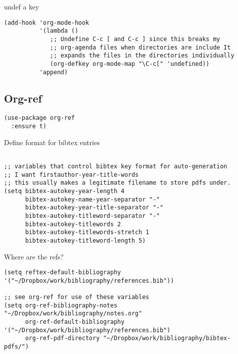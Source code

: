 \documentclass[12pt]{article}
\begin{document}
undef a key

\lstset{language=Lisp,label= ,caption= ,captionpos=b,numbers=none}
\begin{lstlisting}
(add-hook 'org-mode-hook
          '(lambda ()
             ;; Undefine C-c [ and C-c ] since this breaks my
             ;; org-agenda files when directories are include It
             ;; expands the files in the directories individually
             (org-defkey org-mode-map "\C-c[" 'undefined))
          'append)

\end{lstlisting}

\subsection{Org-ref}
\label{sec:org04fd8c5}

\lstset{language=Lisp,label= ,caption= ,captionpos=b,numbers=none}
\begin{lstlisting}
(use-package org-ref
  :ensure t)
\end{lstlisting}

Define format for bibtex entries


\lstset{language=Lisp,label= ,caption= ,captionpos=b,numbers=none}
\begin{lstlisting}

;; variables that control bibtex key format for auto-generation
;; I want firstauthor-year-title-words
;; this usually makes a legitimate filename to store pdfs under.
(setq bibtex-autokey-year-length 4
      bibtex-autokey-name-year-separator "-"
      bibtex-autokey-year-title-separator "-"
      bibtex-autokey-titleword-separator "-"
      bibtex-autokey-titlewords 2
      bibtex-autokey-titlewords-stretch 1
      bibtex-autokey-titleword-length 5)
\end{lstlisting}

Where are the refs?

\lstset{language=Lisp,label= ,caption= ,captionpos=b,numbers=none}
\begin{lstlisting}
(setq reftex-default-bibliography '("~/Dropbox/work/bibliography/references.bib"))

;; see org-ref for use of these variables
(setq org-ref-bibliography-notes "~/Dropbox/work/bibliography/notes.org"
      org-ref-default-bibliography '("~/Dropbox/work/bibliography/references.bib")
      org-ref-pdf-directory "~/Dropbox/work/bibliography/bibtex-pdfs/")



\end{lstlisting}
\end{document}
